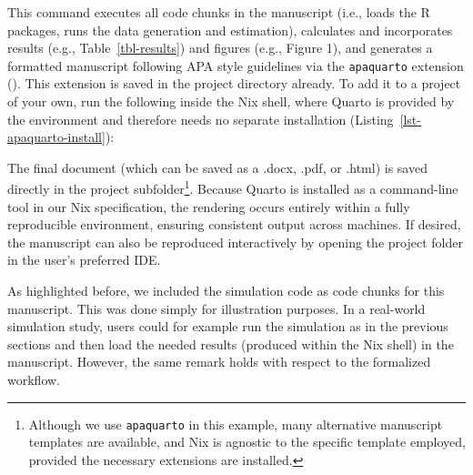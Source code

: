 \documentclass[
  man,
  longtable,
  nolmodern,
  notxfonts,
  notimes,
  colorlinks=true,linkcolor=blue,citecolor=blue,urlcolor=blue]{apa7}
\newenvironment{Shaded}{\begin{snugshade}}{\end{snugshade}}
\newcommand{\ExtensionTok}[1]{\textcolor[rgb]{0.00,0.23,0.31}{#1}}
\newcommand{\NormalTok}[1]{\textcolor[rgb]{0.00,0.23,0.31}{#1}}
\begin{document}
This command executes all code chunks in the manuscript (i.e., loads the
R packages, runs the data generation and estimation), calculates and
incorporates results (e.g., Table~\ref{tbl-results}) and figures (e.g.,
Figure 1), and generates a formatted manuscript following APA style
guidelines via the \texttt{apaquarto} extension
(). This extension is
saved in the project directory already. To add it to a project of your
own, run the following inside the Nix shell, where Quarto is provided by
the environment and therefore needs no separate installation
(Listing~\ref{lst-apaquarto-install}):

\begin{codelisting}

\caption{\label{lst-apaquarto-install}Adding the apaquarto extension
\normalsize}

\centering{

\small

\begin{Shaded}
\begin{Highlighting}[]
\ExtensionTok{[nix{-}shell:\textasciitilde{}/Why{-}risk{-}it{-}when{-}you{-}can{-}rix{-}it]$}
  \ExtensionTok{quarto}\NormalTok{ add wjschne/apaquarto}
\end{Highlighting}
\end{Shaded}

}

\end{codelisting}%

The final document (which can be saved as a .docx, .pdf, or .html) is
saved directly in the project subfolder\footnote{Although we use
  \texttt{apaquarto} in this example, many alternative manuscript
  templates are available, and Nix is agnostic to the specific template
  employed, provided the necessary extensions are installed.}. Because
Quarto is installed as a command-line tool in our Nix specification, the
rendering occurs entirely within a fully reproducible environment,
ensuring consistent output across machines. If desired, the manuscript
can also be reproduced interactively by opening the project folder in
the user's preferred IDE.

As highlighted before, we included the simulation code as code chunks
for this manuscript. This was done simply for illustration purposes. In
a real-world simulation study, users could for example run the
simulation as in the previous sections and then load the needed results
(produced within the Nix shell) in the manuscript. However, the same
remark holds with respect to the formalized workflow.
\end{document}
